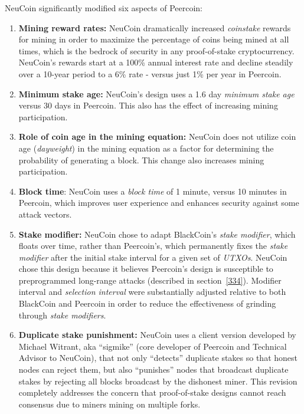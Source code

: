 \documentclass[a4paper,11pt]{article}
\begin{document}
NeuCoin significantly modified six aspects of Peercoin: 

\begin{enumerate}
\setlength{\itemsep}{0pt}
\item{\textbf{Mining reward rates:} NeuCoin dramatically increased \textit{coinstake} rewards for mining in order to maximize the percentage of coins being mined at all times, which is the bedrock of security in any proof-of-stake cryptocurrency. NeuCoin's rewards start at a 100\% annual interest rate and decline steadily over a 10-year period to a 6\% rate - versus just 1\% per year in Peercoin.}
\item{\textbf{Minimum stake age:} NeuCoin's design uses a 1.6 day \textit{minimum stake age} versus 30 days in Peercoin. This also has the effect of increasing mining participation.}
\item{\textbf{Role of coin age in the mining equation:} NeuCoin does not utilize coin age (\textit{dayweight}) in the mining equation as a factor for determining the probability of generating a block. This change also increases mining participation.}
\item{\textbf{Block time}: NeuCoin uses a \textit{block time} of 1 minute, versus 10 minutes in Peercoin, which improves user experience and enhances security against some attack vectors.}
\item{\textbf{Stake modifier:} NeuCoin chose to adapt BlackCoin's \textit{stake modifier}, which floats over time, rather than Peercoin's, which permanently fixes the \textit{stake modifier} after the initial stake interval for a given set of \textit{UTXOs}. NeuCoin chose this design because it believes Peercoin's design is susceptible to preprogrammed long-range attacks (described in section~\ref{334}). Modifier interval and \textit{selection interval} were substantially adjusted relative to both BlackCoin and Peercoin in order to reduce the effectiveness of grinding through \textit{stake modifiers}.}
\item{\textbf{Duplicate stake punishment:} NeuCoin uses a client version developed by Michael Witrant, aka ``sigmike'' (core developer of Peercoin and Technical Advisor to NeuCoin), that not only “detects” duplicate stakes so that honest nodes can reject them, but also “punishes” nodes that broadcast duplicate stakes by rejecting all blocks broadcast by the dishonest miner. This revision completely addresses the concern that proof-of-stake designs cannot reach consensus due to miners mining on multiple forks.}
\end{enumerate}
\end{document}
